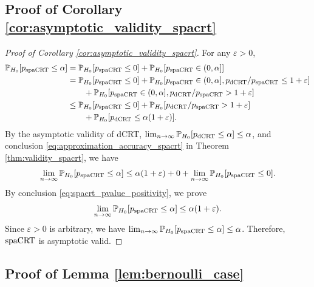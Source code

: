 \documentclass[12pt]{article}
\theoremstyle{definition}
\def\P{\mathbb{P}}
\def\P{\mathbb{P}}
\renewcommand{\P}{\mathbb{P}}							%
\newcommand{\dCRT}{\textnormal{dCRT}} 					%
\newcommand{\spacrt}{\textnormal{spaCRT}}               %
\begin{document}
  \subsection{Proof of Corollary \ref{cor:asymptotic_validity_spacrt}}

  \begin{proof}[Proof of Corollary \ref{cor:asymptotic_validity_spacrt}]
    
    For any $\varepsilon>0$,
    \begin{align*}
      \P_{H_0}[p_{\spacrt}\leq \alpha]
      &
      =\P_{H_0}[p_{\spacrt}\leq 0]+\P_{H_0}[p_{\spacrt}\in (0,\alpha]]\\
      &
      =\P_{H_0}[p_{\spacrt}\leq 0]+\P_{H_0}[p_{\spacrt}\in (0,\alpha],p_{\dCRT}/p_{\spacrt}\leq 1+\varepsilon]\\
      &
      \qquad+\P_{H_0}[p_{\spacrt}\in (0,\alpha],p_{\dCRT}/p_{\spacrt}> 1+\varepsilon]\\
      &
      \leq \P_{H_0}[p_{\spacrt}\leq 0]+\P_{H_0}[p_{\dCRT}/p_{\spacrt}> 1+\varepsilon]\\
      &
      \qquad+\P_{H_0}[p_{\dCRT}\leq\alpha(1+\varepsilon)].
    \end{align*}
    By the asymptotic validity of dCRT, $\lim_{n\rightarrow\infty}\P_{H_0}[p_{\dCRT}\leq\alpha]\leq\alpha$, and conclusion \eqref{eq:approximation_accuracy_spacrt} in Theorem \ref{thm:validity_spacrt}, we have 
    \begin{align*}
      \lim_{n\rightarrow\infty}\P_{H_0}[p_{\spacrt}\leq\alpha]\leq \alpha(1+\varepsilon) + 0 + \lim_{n\rightarrow\infty}\P_{H_0}[p_{\spacrt}\leq 0].
    \end{align*}
    By conclusion \eqref{eq:spacrt_pvalue_positivity}, we prove 
    \begin{align*}
      \lim_{n\rightarrow\infty}\P_{H_0}[p_{\spacrt}\leq\alpha]\leq \alpha(1+\varepsilon).
    \end{align*}
    Since $\varepsilon>0$ is arbitrary, we have $\lim_{n\rightarrow\infty}\P_{H_0}[p_{\spacrt}\leq \alpha]\leq \alpha$. Therefore, $\spacrt$ is asymptotic valid.

  \end{proof}

  \subsection{Proof of Lemma \ref{lem:bernoulli_case}}
\end{document}
